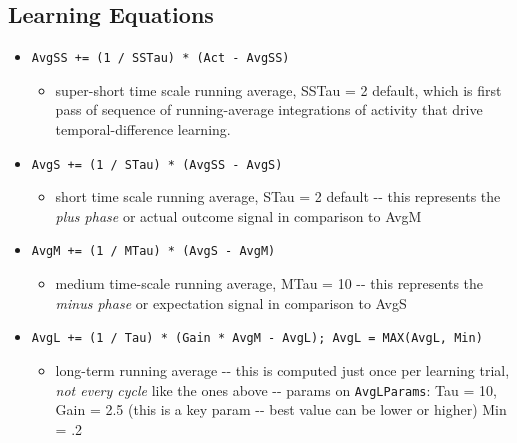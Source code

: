 \documentclass[10pt,letterpaper]{article}
\begin{document}
\subsection{Learning Equations}

\begin{itemize}
	
  \item \texttt{AvgSS\ +=\ (1\ /\ SSTau)\ *\ (Act\ -\ AvgSS)}

    \begin{itemize}
	
    \item
      super-short time scale running average, SSTau = 2 default, which is first pass of sequence of running-average integrations of activity that drive temporal-difference learning.
    \end{itemize}
	
  \item \texttt{AvgS\ +=\ (1\ /\ STau)\ *\ (AvgSS\ -\ AvgS)}

    \begin{itemize}
	
    \item
      short time scale running average, STau = 2 default -\/- this
      represents the \emph{plus phase} or actual outcome signal in
      comparison to AvgM
    \end{itemize}
	
  \item \texttt{AvgM\ +=\ (1\ /\ MTau)\ *\ (AvgS\ -\ AvgM)}

    \begin{itemize}
	
    \item
      medium time-scale running average, MTau = 10 -\/- this represents
      the \emph{minus phase} or expectation signal in comparison to AvgS
    \end{itemize}
	
  \item \texttt{AvgL\ +=\ (1\ /\ Tau)\ *\ (Gain\ *\ AvgM\ -\ AvgL);\ AvgL\ =\ MAX(AvgL,\ Min)}

    \begin{itemize}
	
    \item
      long-term running average -\/- this is computed just once per
      learning trial, \emph{not every cycle} like the ones above -\/-
      params on \texttt{AvgLParams}: Tau = 10, Gain = 2.5 (this is a key
      param -\/- best value can be lower or higher) Min = .2
    \end{itemize}
	

\end{itemize}
\end{document}
